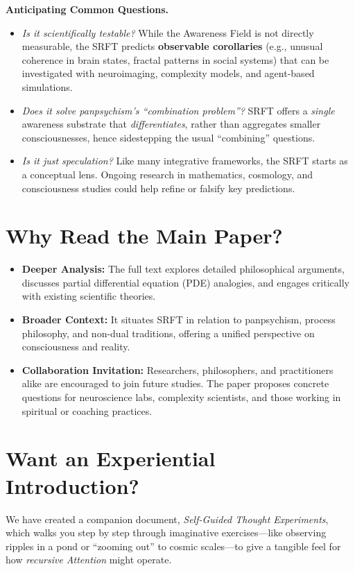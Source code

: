 \documentclass[12pt]{article}
\begin{document}
\medskip
\noindent
\textbf{Anticipating Common Questions.}\\
\begin{itemize}
\item \emph{Is it scientifically testable?} While the Awareness Field 
is not directly measurable, the SRFT predicts \textbf{observable corollaries} 
(e.g., unusual coherence in brain states, fractal patterns in social systems) 
that can be investigated with neuroimaging, complexity models, and agent-based 
simulations.
\item \emph{Does it solve panpsychism’s ``combination problem''?} SRFT offers 
a \emph{single} awareness substrate that \emph{differentiates}, rather than 
aggregates smaller consciousnesses, hence sidestepping the usual ``combining'' 
questions.
\item \emph{Is it just speculation?} Like many integrative frameworks, 
the SRFT starts as a conceptual lens. Ongoing research in mathematics, 
cosmology, and consciousness studies could help refine or falsify key 
predictions.
\end{itemize}

\medskip
\noindent
\section*{Why Read the Main Paper?}
\begin{itemize}
\item \textbf{Deeper Analysis:} The full text explores detailed philosophical 
arguments, discusses partial differential equation (PDE) analogies, and engages 
critically with existing scientific theories.
\item \textbf{Broader Context:} It situates SRFT in relation to panpsychism, 
process philosophy, and non-dual traditions, offering a unified perspective 
on consciousness and reality.
\item \textbf{Collaboration Invitation:} Researchers, philosophers, and 
practitioners alike are encouraged to join future studies. The paper proposes 
concrete questions for neuroscience labs, complexity scientists, and those 
working in spiritual or coaching practices.
\end{itemize}

\medskip
\noindent
\section*{Want an Experiential Introduction?}
We have created a companion document, \emph{Self-Guided Thought Experiments}, 
which walks you step by step through imaginative exercises—like observing 
ripples in a pond or “zooming out” to cosmic scales—to give a tangible feel 
for how \emph{recursive Attention} might operate.
\end{document}
